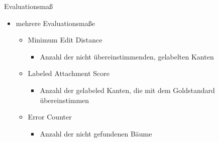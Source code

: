\documentclass{beamer} %
\begin{document}
\begin{frame}{Evaluationsmaß}
    \begin{itemize}
        \item mehrere Evaluationsmaße
            \begin{itemize}
                \item Minimum Edit Distance
                    \begin{itemize}
                        \item Anzahl der nicht übereinstimmenden, gelabelten Kanten
                    \end{itemize}
                \item Labeled Attachment Score
                    \begin{itemize}
                        \item Anzahl der gelabeled Kanten, die mit dem Goldstandard übereinstimmen
                    \end{itemize}
                \item Error Counter
                    \begin{itemize}
                        \item Anzahl der nicht gefundenen Bäume
                    \end{itemize}
            \end{itemize}
    \end{itemize}
\end{frame}
\end{document}
